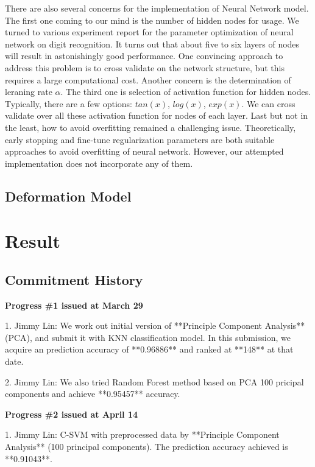 \documentclass{article} %
\begin{document}
There are also several concerns for the implementation of Neural Network model.
The first one coming to our mind is the number of hidden nodes for usage. We
turned to various experiment report for the parameter optimization of neural
network on digit recognition. It turns out that about five to six layers of
nodes will result in astonishingly good performance. One convincing approach
to address this problem is to cross validate on the network structure, but
this requires a large computational cost.
Another concern is the determination of leraning rate $\alpha$. The third one
is selection of activation function for hidden nodes. Typically, there are a
few options: $tan(x)$, $log(x)$, $exp(x)$. We can cross validate over all
these activation function for nodes of each layer. Last but not in the least,
 how to avoid overfitting remained a challenging issue. Theoretically, early
 stopping and fine-tune regularization parameters are both suitable approaches
 to avoid overfitting of neural network. However, our attempted implementation
 does not incorporate any of them. 

\subsection{Deformation Model}

\section{Result} \label{Comparison}

\subsection{Commitment History}
{\bf Progress \#1 issued at March 29 }

1. Jimmy Lin: We work out initial version of **Principle Component Analysis**(PCA), and
submit it with KNN classification model. In this submission, we acquire an
prediction accuracy of **0.96886** and ranked at **148** at that date. 

2. Jimmy Lin: We also tried Random Forest method based on PCA 100 pricipal components and
achieve **0.95457** accuracy.

{\bf Progress \#2 issued at April 14 }

1. Jimmy Lin: C-SVM with preprocessed data by **Principle Component Analysis** (100
principal components). The prediction accuracy achieved is **0.91043**.
\end{document}
